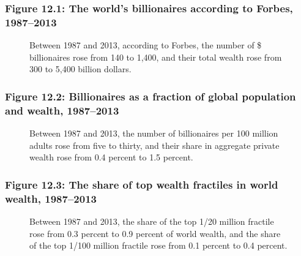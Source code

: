 \documentclass[t]{beamer}\usepackage[]{graphicx}\usepackage[]{color}
\begin{document}
\begin{frame}[label=Figure_12_1]
\frametitle{Figure 12.1: The world's billionaires according to Forbes, 1987--2013}
\begin{figure}[t]
\begin{minipage}[b]{\textwidth}
\centering

\caption{Between 1987 and 2013, according to Forbes, the number of \$ billionaires rose from 140 to 1,400, and their total wealth rose from 300 to 5,400 billion dollars.}
\end{minipage}
\end{figure}
\end{frame}


\begin{frame}[label=Figure_12_2]
\frametitle{Figure 12.2: Billionaires as a fraction of global population and wealth, 1987--2013}
\begin{figure}[t]
\begin{minipage}[b]{\textwidth}
\centering

\caption{Between 1987 and 2013, the number of billionaires per 100 million adults rose from five to thirty, and their share in aggregate private wealth rose from 0.4 percent to 1.5 percent.}
\end{minipage}
\end{figure}
\end{frame}


\begin{frame}[label=Figure_12_3]
\frametitle{Figure 12.3: The share of top wealth fractiles in world wealth, 1987--2013}
\begin{figure}[t]
\begin{minipage}[b]{\textwidth}
\centering

\caption{Between 1987 and 2013, the share of the top 1/20 million fractile rose from 0.3 percent to 0.9 percent of world wealth, and the share of the top 1/100 million fractile rose from 0.1 percent to 0.4 percent.}
\end{minipage}
\end{figure}
\end{frame}
\end{document}
